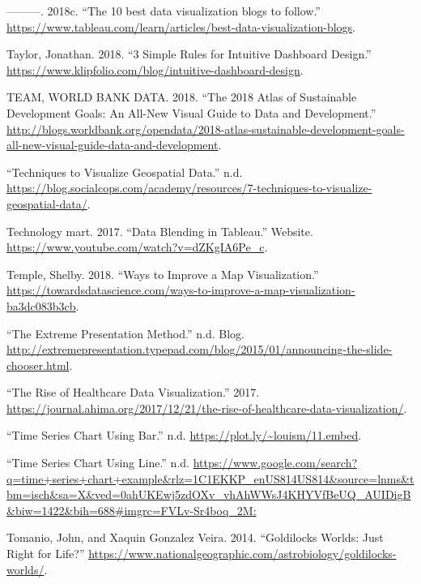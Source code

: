 \documentclass[]{book}
\begin{document}
\leavevmode\hypertarget{ref-Top_10_Blogs}{}%
---------. 2018c. ``The 10 best data visualization blogs to follow.'' \url{https://www.tableau.com/learn/articles/best-data-visualization-blogs}.

\leavevmode\hypertarget{ref-intuitive_dash}{}%
Taylor, Jonathan. 2018. ``3 Simple Rules for Intuitive Dashboard Design.'' \url{https://www.klipfolio.com/blog/intuitive-dashboard-design}.

\leavevmode\hypertarget{ref-world_bank_data}{}%
TEAM, WORLD BANK DATA. 2018. ``The 2018 Atlas of Sustainable Development Goals: An All-New Visual Guide to Data and Development.'' \url{http://blogs.worldbank.org/opendata/2018-atlas-sustainable-development-goals-all-new-visual-guide-data-and-development}.

\leavevmode\hypertarget{ref-Popular_Map_Types2}{}%
``Techniques to Visualize Geospatial Data.'' n.d. \url{https://blog.socialcops.com/academy/resources/7-techniques-to-visualize-geospatial-data/}.

\leavevmode\hypertarget{ref-datablendingintableau}{}%
Technology mart. 2017. ``Data Blending in Tableau.'' Website. \url{https://www.youtube.com/watch?v=dZKgIA6Pe_c}.

\leavevmode\hypertarget{ref-profit_ratio}{}%
Temple, Shelby. 2018. ``Ways to Improve a Map Visualization.'' \url{https://towardsdatascience.com/ways-to-improve-a-map-visualization-ba3dc083b3cb}.

\leavevmode\hypertarget{ref-extremepre}{}%
``The Extreme Presentation Method.'' n.d. Blog. \url{http://extremepresentation.typepad.com/blog/2015/01/announcing-the-slide-chooser.html}.

\leavevmode\hypertarget{ref-rise_of_healthcare}{}%
``The Rise of Healthcare Data Visualization.'' 2017. \url{https://journal.ahima.org/2017/12/21/the-rise-of-healthcare-data-visualization/}.

\leavevmode\hypertarget{ref-Time_Series_chart_bar}{}%
``Time Series Chart Using Bar.'' n.d. \url{https://plot.ly/~louism/11.embed}.

\leavevmode\hypertarget{ref-Time_Series_chart_line}{}%
``Time Series Chart Using Line.'' n.d. \url{https://www.google.com/search?q=time+series+chart+example\&rlz=1C1EKKP_enUS814US814\&source=lnms\&tbm=isch\&sa=X\&ved=0ahUKEwj5zdOXv_vhAhWWsJ4KHYVfBeUQ_AUIDigB\&biw=1422\&bih=688\#imgrc=FVLv-Sr4boq_2M:}

\leavevmode\hypertarget{ref-goldilocks_worlds}{}%
Tomanio, John, and Xaquin Gonzalez Veira. 2014. ``Goldilocks Worlds: Just Right for Life?'' \url{https://www.nationalgeographic.com/astrobiology/goldilocks-worlds/}.
\end{document}
